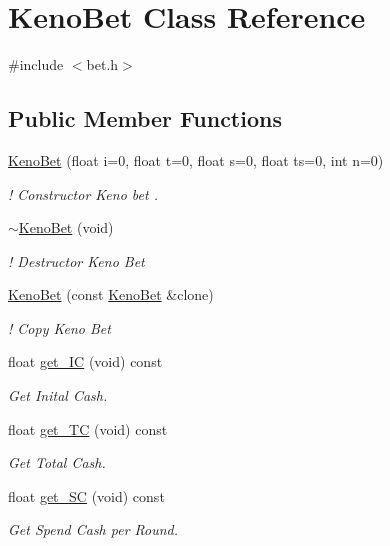 \hypertarget{classKenoBet}{}\section{Keno\+Bet Class Reference}
\label{classKenoBet}


{\ttfamily \#include $<$bet.\+h$>$}

\subsection*{Public Member Functions}
\begin{DoxyCompactItemize}
\item 
\hyperlink{classKenoBet_a225e9428e2bc69acfd4fef3effdd4ccc}{Keno\+Bet} (float i=0, float t=0, float s=0, float ts=0, int n=0)
\begin{DoxyCompactList}\small\item\em ! Constructor Keno bet . \end{DoxyCompactList}\item 
\hyperlink{classKenoBet_aed0e6361718c05a48c1be8653ffcf2d4}{$\sim$\+Keno\+Bet} (void)
\begin{DoxyCompactList}\small\item\em ! Destructor Keno Bet \end{DoxyCompactList}\item 
\hyperlink{classKenoBet_aaabc53c7d5505c3aae1de7b685f72f05}{Keno\+Bet} (const \hyperlink{classKenoBet}{Keno\+Bet} \&clone)
\begin{DoxyCompactList}\small\item\em ! Copy Keno Bet \end{DoxyCompactList}\item 
float \hyperlink{classKenoBet_aace00d82c42c9870a4f3b95c7ec79f24}{get\+\_\+\+IC} (void) const
\begin{DoxyCompactList}\small\item\em Get Inital Cash. \end{DoxyCompactList}\item 
float \hyperlink{classKenoBet_ade294f6dcb57c7a55be5ce2303664b0a}{get\+\_\+\+TC} (void) const
\begin{DoxyCompactList}\small\item\em Get Total Cash. \end{DoxyCompactList}\item 
float \hyperlink{classKenoBet_a0c2ee88fc2f8e7afc5b0399fe74c022b}{get\+\_\+\+SC} (void) const
\begin{DoxyCompactList}\small\item\em Get Spend Cash per Round. \end{DoxyCompactList}\item 

\end{DoxyCompactItemize}
